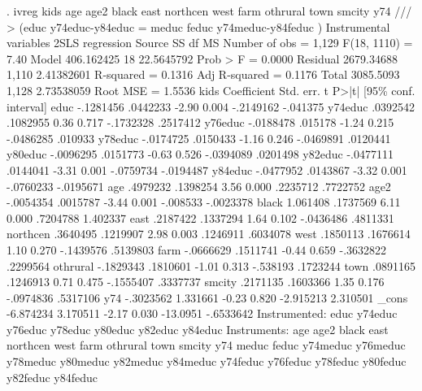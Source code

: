 . ivreg kids age age2 black east northcen west farm othrural town smcity y74 ///
> (educ y74educ-y84educ = meduc feduc y74meduc-y84feduc )
{\smallskip}
Instrumental variables 2SLS regression
{\smallskip}
      Source {\VBAR}       SS           df       MS      Number of obs   =     1,129
   F(18, 1110)     =      7.40
       Model {\VBAR}  406.162425        18  22.5645792   Prob > F        =    0.0000
    Residual {\VBAR}  2679.34688     1,110  2.41382601   R-squared       =    0.1316
   Adj R-squared   =    0.1176
       Total {\VBAR}   3085.5093     1,128  2.73538059   Root MSE        =    1.5536
{\smallskip}
        kids {\VBAR} Coefficient  Std. err.      t    P>|t|     [95\% conf. interval]
        educ {\VBAR}  -.1281456   .0442233    -2.90   0.004    -.2149162    -.041375
     y74educ {\VBAR}   .0392542   .1082955     0.36   0.717    -.1732328    .2517412
     y76educ {\VBAR}  -.0188478    .015178    -1.24   0.215    -.0486285     .010933
     y78educ {\VBAR}  -.0174725   .0150433    -1.16   0.246    -.0469891    .0120441
     y80educ {\VBAR}  -.0096295   .0151773    -0.63   0.526    -.0394089    .0201498
     y82educ {\VBAR}  -.0477111   .0144041    -3.31   0.001    -.0759734   -.0194487
     y84educ {\VBAR}  -.0477952   .0143867    -3.32   0.001    -.0760233   -.0195671
         age {\VBAR}   .4979232   .1398254     3.56   0.000     .2235712    .7722752
        age2 {\VBAR}  -.0054354   .0015787    -3.44   0.001     -.008533   -.0023378
       black {\VBAR}   1.061408   .1737569     6.11   0.000     .7204788    1.402337
        east {\VBAR}   .2187422   .1337294     1.64   0.102    -.0436486    .4811331
    northcen {\VBAR}   .3640495   .1219907     2.98   0.003     .1246911    .6034078
        west {\VBAR}   .1850113   .1676614     1.10   0.270    -.1439576    .5139803
        farm {\VBAR}  -.0666629   .1511741    -0.44   0.659    -.3632822    .2299564
    othrural {\VBAR}  -.1829343   .1810601    -1.01   0.313     -.538193    .1723244
        town {\VBAR}   .0891165   .1246913     0.71   0.475    -.1555407    .3337737
      smcity {\VBAR}   .2171135   .1603366     1.35   0.176    -.0974836    .5317106
         y74 {\VBAR}  -.3023562   1.331661    -0.23   0.820    -2.915213    2.310501
       _cons {\VBAR}  -6.874234   3.170511    -2.17   0.030     -13.0951   -.6533642
Instrumented: educ y74educ y76educ y78educ y80educ y82educ y84educ
 Instruments: age age2 black east northcen west farm othrural town smcity
              y74 meduc feduc y74meduc y76meduc y78meduc y80meduc y82meduc
              y84meduc y74feduc y76feduc y78feduc y80feduc y82feduc y84feduc
{\smallskip}
